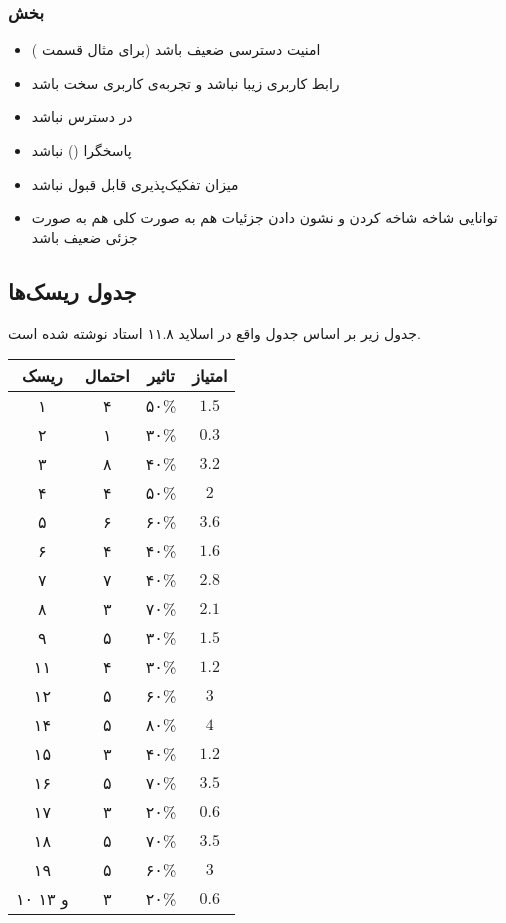 \subsubsection{بخش }
\begin{itemize}
\item[\risk]
امنیت دسترسی ضعیف باشد (برای مثال قسمت )

\item[\risk]
رابط کاربری زیبا نباشد و تجربه‌ی کاربری سخت باشد

\item[\risk]
در دسترس نباشد

\item[\risk]
پاسخگرا () نباشد

\item[\risk]
میزان تفکیک‌پذیری قابل قبول نباشد

\item[\risk]
توانایی شاخه شاخه کردن و نشون دادن جزئیات هم به صورت کلی هم به صورت جزئی ضعیف باشد
\end{itemize}

\subsection{جدول ریسک‌ها}
جدول زیر بر اساس جدول واقع در اسلاید ۱۱.۸ استاد نوشته شده است.
\begin{table}[H]
\begin{center}
\begin{tabular}{|c|c|c|c|}
\hline
ریسک &
احتمال &
تاثیر &
امتیاز \\
\hline
\hline

۱ &
۴ &
۵۰\%&
$1.5$
\\
\hline
۲ &
۱ &
۳۰\%&
$0.3$\\
\hline
۳ &
۸ &
۴۰\%&
$3.2$\\
\hline
۴ &
۴ &
۵۰\%&
$2$\\
\hline
۵ &
۶ &
۶۰\% &
$3.6$\\
\hline
۶ &
۴ &
۴۰\%&
$1.6$\\
\hline
۷ &
۷ &
۴۰\%&
$2.8$\\
\hline
۸ &
۳ &
۷۰\%&
$2.1$\\
\hline
۹ &
۵ &
۳۰\%&
$1.5$\\
\hline
۱۱ &
۴ &
۳۰\%&
$1.2$\\
\hline
۱۲ &
۵ &
۶۰\%&
$3$\\
\hline
۱۴ &
۵ &
۸۰\%&
$4$\\
\hline
۱۵ &
۳ &
۴۰\%&
$1.2$\\
\hline
۱۶ &
۵ &
۷۰\%&
$3.5$\\
\hline
۱۷ &
۳ &
۲۰\%&
$0.6$\\
\hline
۱۸ &
۵ &
۷۰\%&
$3.5$\\
\hline
۱۹ &
۵&
۶۰\%&
$3$\\
\hline

۱۰ و ۱۳ &
۳&
۲۰\%&
$0.6$\\
\hline

\end{tabular}
\end{center}
\end{table}

